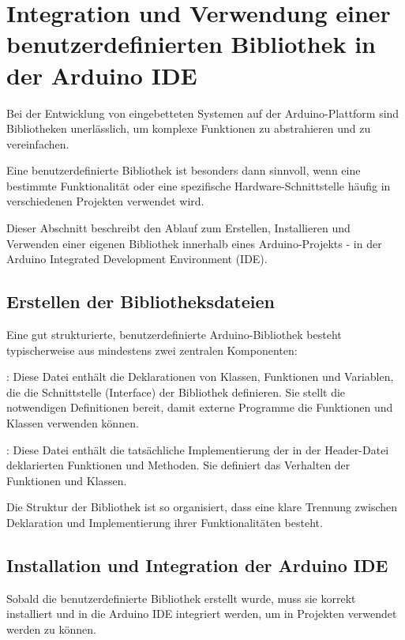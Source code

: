 \section{Integration und Verwendung einer benutzerdefinierten Bibliothek in der Arduino IDE}
\label{BenutzerdefinierteBibliothekIDE}

Bei der Entwicklung von eingebetteten Systemen auf der Arduino-Plattform sind Bibliotheken unerlässlich, um komplexe Funktionen zu abstrahieren und zu vereinfachen. 

Eine benutzerdefinierte Bibliothek ist besonders dann sinnvoll, wenn eine bestimmte Funktionalität oder eine spezifische Hardware-Schnittstelle häufig in verschiedenen Projekten verwendet wird. 

Dieser Abschnitt beschreibt den Ablauf zum Erstellen, Installieren und Verwenden einer eigenen Bibliothek innerhalb eines Arduino-Projekts - in der Arduino Integrated Development Environment (IDE). 

\subsection{Erstellen der Bibliotheksdateien}

Eine gut strukturierte, benutzerdefinierte Arduino-Bibliothek besteht typischerweise aus mindestens zwei zentralen Komponenten: 

: Diese Datei enthält die Deklarationen von Klassen, Funktionen und Variablen, 
die die Schnittstelle (Interface) der Bibliothek definieren. 
Sie stellt die notwendigen Definitionen bereit, damit externe Programme die Funktionen und Klassen verwenden können. 

: Diese Datei enthält die tatsächliche Implementierung der in der Header-Datei 
deklarierten Funktionen und Methoden. 
Sie definiert das Verhalten der Funktionen und Klassen. 

Die Struktur der Bibliothek ist so organisiert, dass eine klare Trennung zwischen Deklaration und Implementierung ihrer Funktionalitäten besteht. 

\subsection{Installation und Integration der Arduino IDE}

Sobald die benutzerdefinierte Bibliothek erstellt wurde, muss sie korrekt installiert und in die Arduino IDE integriert werden, um in Projekten verwendet werden zu können. 

